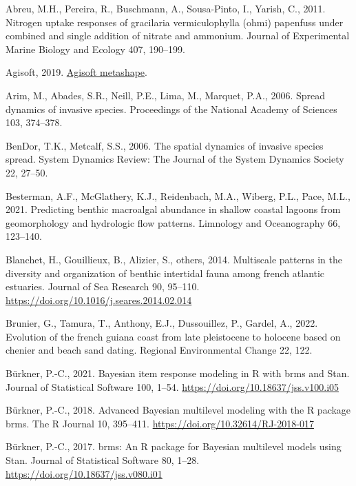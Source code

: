 \documentclass[
  letterpaper,
  DIV=11,
  numbers=noendperiod]{scrartcl}
\newlength{\cslhangindent}
\newenvironment{CSLReferences}[2] %
 {\begin{list}{}{%
  \setlength{\itemindent}{0pt}
  \setlength{\leftmargin}{0pt}
  \setlength{\parsep}{0pt}
  \ifodd #1
   \setlength{\leftmargin}{\cslhangindent}
   \setlength{\itemindent}{-1\cslhangindent}
  \fi
  \setlength{\itemsep}{#2\baselineskip}}}
 {\end{list}}
\begin{document}
\label{refs}
\begin{CSLReferences}{1}{0}
Abreu, M.H., Pereira, R., Buschmann, A., Sousa-Pinto, I., Yarish, C.,
2011. Nitrogen uptake responses of gracilaria vermiculophylla (ohmi)
papenfuss under combined and single addition of nitrate and ammonium.
Journal of Experimental Marine Biology and Ecology 407, 190--199.

Agisoft, 2019. \href{https://www.agisoft.com/}{Agisoft metashape}.

Arim, M., Abades, S.R., Neill, P.E., Lima, M., Marquet, P.A., 2006.
Spread dynamics of invasive species. Proceedings of the National Academy
of Sciences 103, 374--378.

BenDor, T.K., Metcalf, S.S., 2006. The spatial dynamics of invasive
species spread. System Dynamics Review: The Journal of the System
Dynamics Society 22, 27--50.

Besterman, A.F., McGlathery, K.J., Reidenbach, M.A., Wiberg, P.L., Pace,
M.L., 2021. Predicting benthic macroalgal abundance in shallow coastal
lagoons from geomorphology and hydrologic flow patterns. Limnology and
Oceanography 66, 123--140.

Blanchet, H., Gouillieux, B., Alizier, S., others, 2014. Multiscale
patterns in the diversity and organization of benthic intertidal fauna
among french atlantic estuaries. Journal of Sea Research 90, 95--110.
\url{https://doi.org/10.1016/j.seares.2014.02.014}

Brunier, G., Tamura, T., Anthony, E.J., Dussouillez, P., Gardel, A.,
2022. Evolution of the french guiana coast from late pleistocene to
holocene based on chenier and beach sand dating. Regional Environmental
Change 22, 122.

Bürkner, P.-C., 2021. Bayesian item response modeling in {R} with {brms}
and {Stan}. Journal of Statistical Software 100, 1--54.
\url{https://doi.org/10.18637/jss.v100.i05}

Bürkner, P.-C., 2018. Advanced {Bayesian} multilevel modeling with the
{R} package {brms}. The R Journal 10, 395--411.
\url{https://doi.org/10.32614/RJ-2018-017}

Bürkner, P.-C., 2017. {brms}: An {R} package for {Bayesian} multilevel
models using {Stan}. Journal of Statistical Software 80, 1--28.
\url{https://doi.org/10.18637/jss.v080.i01}


\end{CSLReferences}
\end{document}

